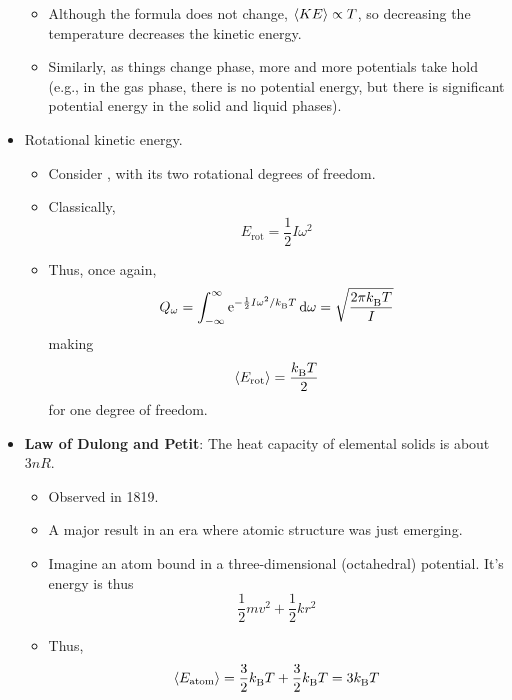 \documentclass[../notes.tex]{subfiles}
\begin{document}
\begin{itemize}
    \begin{itemize}
        \item Although the formula does not change, $\prb{KE}\propto T$, so decreasing the temperature decreases the kinetic energy.
        \item Similarly, as things change phase, more and more potentials take hold (e.g., in the gas phase, there is no potential energy, but there is significant potential energy in the solid and liquid phases).
    \end{itemize}
    \item Rotational kinetic energy.
    \begin{itemize}
        \item Consider , with its two rotational degrees of freedom.
        \item Classically,
        \begin{equation*}
            E_\text{rot} = \frac{1}{2}I\omega^2
        \end{equation*}
        \item Thus, once again,
        \begin{equation*}
            Q_\omega = \int_{-\infty}^\infty\e[-\frac{1}{2}I\omega^2/\kB T]\dd{\omega}
            = \sqrt{\frac{2\pi \kB T}{I}}
        \end{equation*}
        making
        \begin{equation*}
            \prb{E_\text{rot}} = \frac{\kB T}{2}
        \end{equation*}
        for one degree of freedom.
    \end{itemize}
    \item \textbf{Law of Dulong and Petit}: The heat capacity of elemental solids is about $3nR$.
    \begin{itemize}
        \item Observed in 1819.
        \item A major result in an era where atomic structure was just emerging.
        \item Imagine an atom bound in a three-dimensional (octahedral) potential. It's energy is thus
        \begin{equation*}
            \frac{1}{2}mv^2+\frac{1}{2}kr^2
        \end{equation*}
        \item Thus,
        \begin{align*}
            \prb{E_\text{atom}} &= \frac{3}{2}\kB T+\frac{3}{2}\kB T = 3\kB T\\

\end{align*}
\end{itemize}
\end{itemize}
\end{document}
